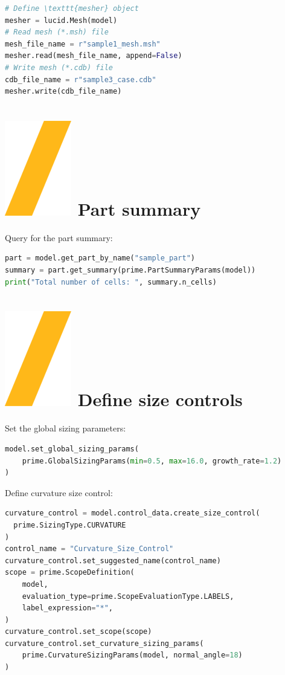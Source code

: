 \documentclass[9pt,landscape]{article}
\begin{document}
\begin{multicols}{3}
\begin{lstlisting}[language=Python]
# Define \texttt{mesher} object
mesher = lucid.Mesh(model)
# Read mesh (*.msh) file
mesh_file_name = r"sample1_mesh.msh"
mesher.read(mesh_file_name, append=False)
# Write mesh (*.cdb) file
cdb_file_name = r"sample3_case.cdb"
mesher.write(cdb_file_name)
\end{lstlisting}

\section{\includegraphics[height=\fontcharht\font`\S]{slash.png} Part summary}
Query for the part summary:
\begin{lstlisting}[language=Python]
part = model.get_part_by_name("sample_part")
summary = part.get_summary(prime.PartSummaryParams(model))
print("Total number of cells: ", summary.n_cells)
\end{lstlisting}

\section{\includegraphics[height=\fontcharht\font`\S]{slash.png} Define size controls}
Set the global sizing parameters: 

\begin{lstlisting}[language=Python]
model.set_global_sizing_params(
    prime.GlobalSizingParams(min=0.5, max=16.0, growth_rate=1.2)
)
\end{lstlisting}

Define curvature size control:
\begin{lstlisting}[language=Python]
curvature_control = model.control_data.create_size_control(
  prime.SizingType.CURVATURE
)
control_name = "Curvature_Size_Control"
curvature_control.set_suggested_name(control_name)
scope = prime.ScopeDefinition(
    model,
    evaluation_type=prime.ScopeEvaluationType.LABELS,
    label_expression="*",
)
curvature_control.set_scope(scope)
curvature_control.set_curvature_sizing_params(
    prime.CurvatureSizingParams(model, normal_angle=18)
)
\end{lstlisting}

\end{multicols}
\end{document}
